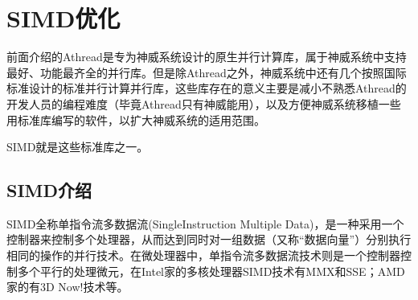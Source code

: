 \chapter{SIMD优化}
前面介绍的Athread是专为神威系统设计的原生并行计算库，属于神威系统中支持最好、功能最齐全的并行库。但是除Athread之外，神威系统中还有几个按照国际标准设计的标准并行计算并行库，这些库存在的意义主要是减小不熟悉Athread的开发人员的编程难度（毕竟Athread只有神威能用），以及方便神威系统移植一些用标准库编写的软件，以扩大神威系统的适用范围。

SIMD就是这些标准库之一。

\section{SIMD介绍}
SIMD全称单指令流多数据流(SingleInstruction Multiple Data)，是一种采用一个控制器来控制多个处理器，从而达到同时对一组数据（又称“数据向量”）分别执行相同的操作的并行技术。在微处理器中，单指令流多数据流技术则是一个控制器控制多个平行的处理微元，在Intel家的多核处理器SIMD技术有MMX和SSE；AMD家的有3D Now!技术等。

